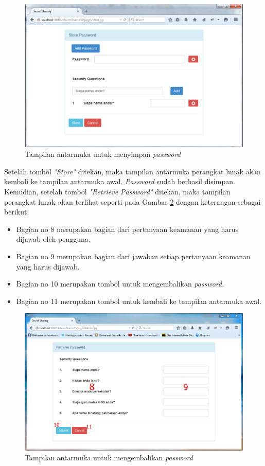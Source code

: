 \begin{figure}[H]
	\includegraphics[scale=0.5]{Gambar/tampilan2_1}
	\centering
	\caption{Tampilan antarmuka untuk menyimpan \textit{password}}\label{fig:tampilan2_1}
\end{figure}

Setelah tombol \textit{"Store"} ditekan, maka tampilan antarmuka perangkat lunak akan kembali ke tampilan antarmuka awal. \textit{Password} sudah berhasil disimpan. Kemudian, setelah tombol \textit{"Retrieve Password"} ditekan, maka tampilan perangkat lunak akan terlihat seperti pada Gambar \ref{fig:tampilan3} dengan keterangan sebagai berikut.

\begin{itemize}
	\item Bagian no 8 merupakan bagian dari pertanyaan keamanan yang harus dijawab oleh pengguna.
	\item Bagian no 9 merupakan bagian dari jawaban setiap pertanyaan keamanan yang harus dijawab.
	\item Bagian no 10 merupakan tombol untuk mengembalikan \textit{password}.
	\item Bagian no 11 merupakan tombol untuk kembali ke tampilan antarmuka awal.
\end{itemize}

\begin{figure}[H]
	\includegraphics[scale=0.5]{Gambar/tampilan3}
	\centering
	\caption{Tampilan antarmuka untuk mengembalikan \textit{password}}\label{fig:tampilan3}
\end{figure}

